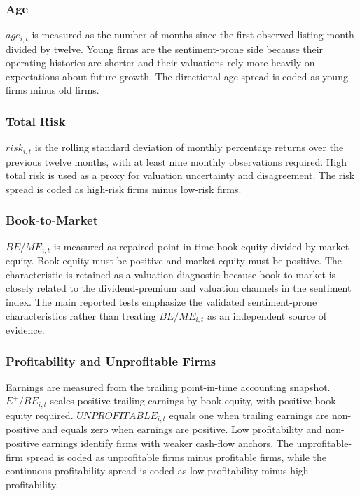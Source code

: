 \documentclass[11pt]{article}
\newcommand{\var}[1]{\ensuremath{#1}}
\begin{document}
\subsubsection{Age}
\var{age_{i,t}} is measured as the number of months since the first observed listing month divided by twelve. Young firms are the sentiment-prone side because their operating histories are shorter and their valuations rely more heavily on expectations about future growth. The directional age spread is coded as young firms minus old firms.

\subsubsection{Total Risk}
\var{risk_{i,t}} is the rolling standard deviation of monthly percentage returns over the previous twelve months, with at least nine monthly observations required. High total risk is used as a proxy for valuation uncertainty and disagreement. The risk spread is coded as high-risk firms minus low-risk firms.

\subsubsection{Book-to-Market}
\var{BE/ME_{i,t}} is measured as repaired point-in-time book equity divided by market equity. Book equity must be positive and market equity must be positive. The characteristic is retained as a valuation diagnostic because book-to-market is closely related to the dividend-premium and valuation channels in the sentiment index. The main reported tests emphasize the validated sentiment-prone characteristics rather than treating \var{BE/ME_{i,t}} as an independent source of evidence.

\subsubsection{Profitability and Unprofitable Firms}
Earnings are measured from the trailing point-in-time accounting snapshot. \var{E^+/BE_{i,t}} scales positive trailing earnings by book equity, with positive book equity required. \var{UNPROFITABLE_{i,t}} equals one when trailing earnings are non-positive and equals zero when earnings are positive. Low profitability and non-positive earnings identify firms with weaker cash-flow anchors. The unprofitable-firm spread is coded as unprofitable firms minus profitable firms, while the continuous profitability spread is coded as low profitability minus high profitability.
\end{document}
